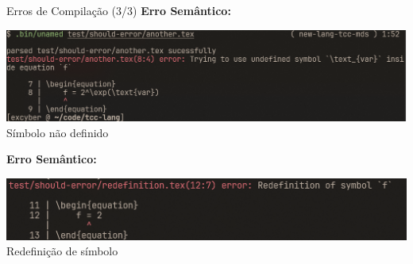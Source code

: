 \begin{frame}{Erros de Compilação (3/3)}
       \textbf{Erro Semântico:}
       \begin{center}
           \includegraphics[width=\textwidth]{./Imagens/error-undefined-symbol.png}
           \small{Símbolo não definido}
       \end{center}
       
       \textbf{Erro Semântico:}
       \begin{center}
           \includegraphics[width=\textwidth]{./Imagens/error-redefinition.png}
           \small{Redefinição de símbolo}
       \end{center}
\end{frame}
